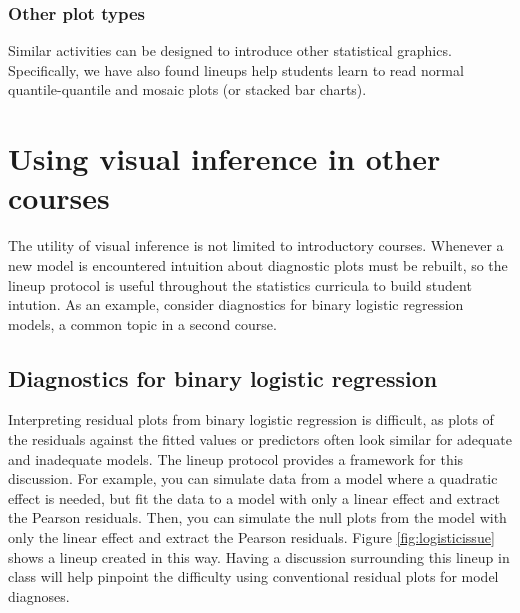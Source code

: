 \documentclass[12pt]{article}
\begin{document}
\hypertarget{other-plot-types}{%
\subsubsection{Other plot types}\label{other-plot-types}}

Similar activities can be designed to introduce other statistical
graphics. Specifically, we have also found lineups help students learn
to read normal quantile-quantile and mosaic plots (or stacked bar
charts).

\section{Using visual inference in other courses}
\label{sec:othercourses}

The utility of visual inference is not limited to introductory courses.
Whenever a new model is encountered intuition about diagnostic plots
must be rebuilt, so the lineup protocol is useful throughout the
statistics curricula to build student intution. As an example, consider
diagnostics for binary logistic regression models, a common topic in a
second course.

\hypertarget{diagnostics-for-binary-logistic-regression}{%
\subsection{Diagnostics for binary logistic
regression}\label{diagnostics-for-binary-logistic-regression}}

Interpreting residual plots from binary logistic regression is
difficult, as plots of the residuals against the fitted values or
predictors often look similar for adequate and inadequate models. The
lineup protocol provides a framework for this discussion. For example,
you can simulate data from a model where a quadratic effect is needed,
but fit the data to a model with only a linear effect and extract the
Pearson residuals. Then, you can simulate the null plots from the model
with only the linear effect and extract the Pearson residuals. Figure
\ref{fig:logisticissue} shows a lineup created in this way. Having a
discussion surrounding this lineup in class will help pinpoint the
difficulty using conventional residual plots for model diagnoses.
\end{document}
